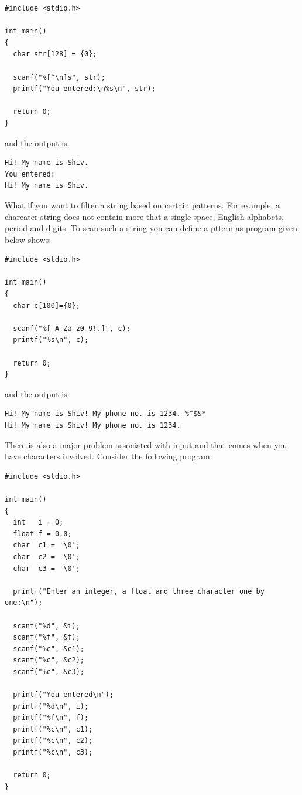 \begin{Verbatim}[frame=single]
#include <stdio.h>

int main()
{
  char str[128] = {0};

  scanf("%[^\n]s", str);
  printf("You entered:\n%s\n", str);

  return 0;
}
\end{Verbatim}

and the output is:

\begin{Verbatim}[frame=single]
Hi! My name is Shiv.
You entered:
Hi! My name is Shiv.
\end{Verbatim}

What if you want to filter a string based on certain patterns. For example, a
charcater string does not contain more that a single space, English alphabets,
period and digits. To scan such a string you can define a pttern as program
given below shows:

\begin{Verbatim}[frame=single]
#include <stdio.h>

int main()
{
  char c[100]={0};

  scanf("%[ A-Za-z0-9!.]", c);
  printf("%s\n", c);

  return 0;
}
\end{Verbatim}

and the output is:

\begin{Verbatim}[frame=single]
Hi! My name is Shiv! My phone no. is 1234. %^$&*
Hi! My name is Shiv! My phone no. is 1234.
\end{Verbatim}

There is also a major problem associated with input and that comes when you
have characters involved. Consider the following program:

\begin{Verbatim}[frame=single]
#include <stdio.h>

int main()
{
  int   i = 0;
  float f = 0.0;
  char  c1 = '\0';
  char  c2 = '\0';
  char  c3 = '\0';

  printf("Enter an integer, a float and three character one by one:\n");

  scanf("%d", &i);
  scanf("%f", &f);
  scanf("%c", &c1);
  scanf("%c", &c2);
  scanf("%c", &c3);

  printf("You entered\n");
  printf("%d\n", i);
  printf("%f\n", f);
  printf("%c\n", c1);
  printf("%c\n", c2);
  printf("%c\n", c3);

  return 0;
}
\end{Verbatim}

